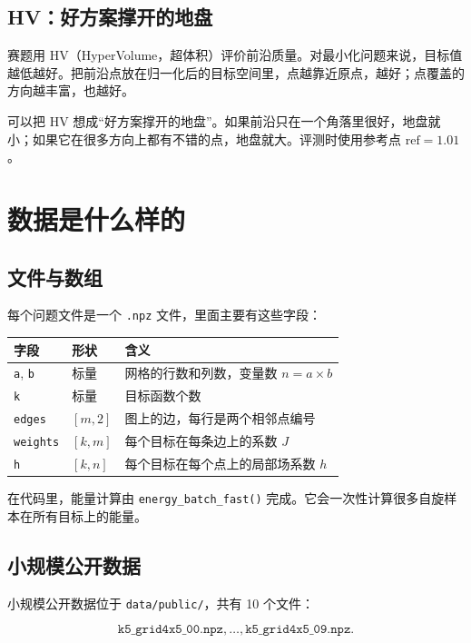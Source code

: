 \documentclass[UTF8,zihao=-4]{ctexart}
\newcommand{\code}[1]{\texttt{#1}}
\begin{document}
\subsection{HV：好方案撑开的地盘}

赛题用 HV（HyperVolume，超体积）评价前沿质量。对最小化问题来说，目标值越低越好。把前沿点放在归一化后的目标空间里，点越靠近原点，越好；点覆盖的方向越丰富，也越好。

可以把 HV 想成“好方案撑开的地盘”。如果前沿只在一个角落里很好，地盘就小；如果它在很多方向上都有不错的点，地盘就大。评测时使用参考点 \(\mathrm{ref}=1.01\)。

\section{数据是什么样的}

\subsection{文件与数组}

每个问题文件是一个 \code{.npz} 文件，里面主要有这些字段：

\begin{center}
\begin{tabular}{lll}
\toprule
字段 & 形状 & 含义 \\
\midrule
\code{a}, \code{b} & 标量 & 网格的行数和列数，变量数 \(n=a\times b\) \\
\code{k} & 标量 & 目标函数个数 \\
\code{edges} & \([m,2]\) & 图上的边，每行是两个相邻点编号 \\
\code{weights} & \([k,m]\) & 每个目标在每条边上的系数 \(J\) \\
\code{h} & \([k,n]\) & 每个目标在每个点上的局部场系数 \(h\) \\
\bottomrule
\end{tabular}
\end{center}

在代码里，能量计算由 \code{energy\_batch\_fast()} 完成。它会一次性计算很多自旋样本在所有目标上的能量。

\subsection{小规模公开数据}

小规模公开数据位于 \code{data/public/}，共有 10 个文件：

\[
\code{k5\_grid4x5\_00.npz},\ldots,\code{k5\_grid4x5\_09.npz}.
\]
\end{document}
